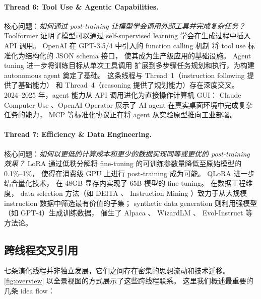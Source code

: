 \paragraph{Thread 6: Tool Use \& Agentic Capabilities.}
核心问题：\textit{如何通过 post-training 让模型学会调用外部工具并完成复杂任务？}
Toolformer \cite{schick2023toolformer} 证明了模型可以通过 self-supervised learning
学会在生成过程中插入 API 调用。
OpenAI 在 GPT-3.5/4 中引入的 function calling 机制
将 tool use 标准化为结构化的 JSON schema 接口，
使其成为生产级应用的基础设施。
Agent tuning \cite{zeng2023agenttuning} 进一步将训练目标从单次工具调用
扩展到多步骤任务规划和执行，为构建 autonomous agent 奠定了基础。
这条线程与 Thread~1（instruction following 提供了基础能力）
和 Thread~4（reasoning 提供了规划能力）存在深度交叉。
2024--2025 年，agent 能力从 API 调用进化为直接操作计算机 GUI：
Claude Computer Use \cite{anthropic2024computeruse}、OpenAI Operator \cite{openai2025operator}
展示了 AI agent 在真实桌面环境中完成复杂任务的能力，
MCP \cite{anthropic2024mcp} 等标准化协议正在将 agent 从实验原型推向工业部署。

\paragraph{Thread 7: Efficiency \& Data Engineering.}
核心问题：\textit{如何以更低的计算成本和更少的数据实现同等或更优的 post-training 效果？}
LoRA \cite{hu2022lora} 通过低秩分解将 fine-tuning 的可训练参数量降低至原始模型的 0.1\%--1\%，
使得在消费级 GPU 上进行 post-training 成为可能。
QLoRA \cite{dettmers2023qlora} 进一步结合量化技术，
在 48GB 显存内实现了 65B 模型的 fine-tuning。
在数据工程维度，
data selection 方法（如 DEITA \cite{liu2024deita}、
Instruction Mining \cite{cao2024instructionmining}）致力于从大规模 instruction 数据中筛选最有价值的子集；
synthetic data generation 则利用强模型（如 GPT-4）生成训练数据，
催生了 Alpaca \cite{taori2023alpaca}、
WizardLM \cite{xu2024wizardlm}、
Evol-Instruct 等方法论。

\subsection{跨线程交叉引用}
\label{sec:t0-crossref}

七条演化线程并非独立发展，它们之间存在密集的思想流动和技术迁移。
\cref{fig:overview} 以全景视图的方式展示了这些跨线程联系。
这里我们概述最重要的几条 idea flow：


